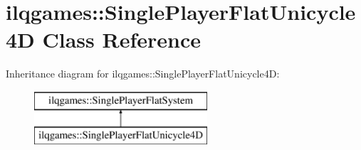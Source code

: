 \hypertarget{classilqgames_1_1_single_player_flat_unicycle4_d}{}\section{ilqgames\+:\+:Single\+Player\+Flat\+Unicycle4D Class Reference}
\label{classilqgames_1_1_single_player_flat_unicycle4_d}
Inheritance diagram for ilqgames\+:\+:Single\+Player\+Flat\+Unicycle4D\+:\begin{figure}[H]
\begin{center}
\leavevmode
\includegraphics[height=2.000000cm]{classilqgames_1_1_single_player_flat_unicycle4_d}
\end{center}
\end{figure}

